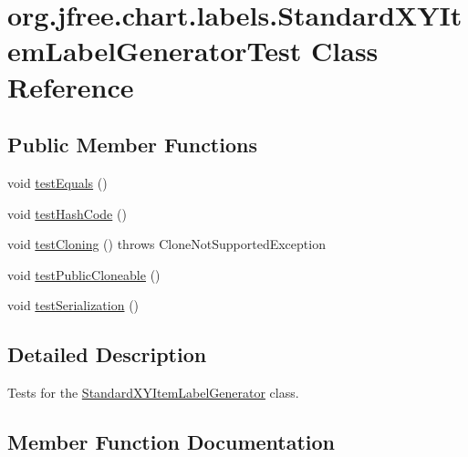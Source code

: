 \hypertarget{classorg_1_1jfree_1_1chart_1_1labels_1_1_standard_x_y_item_label_generator_test}{}\section{org.\+jfree.\+chart.\+labels.\+Standard\+X\+Y\+Item\+Label\+Generator\+Test Class Reference}
\label{classorg_1_1jfree_1_1chart_1_1labels_1_1_standard_x_y_item_label_generator_test}
\subsection*{Public Member Functions}
\begin{DoxyCompactItemize}
\item 
void \mbox{\hyperlink{classorg_1_1jfree_1_1chart_1_1labels_1_1_standard_x_y_item_label_generator_test_af247c811a6679d9d69b73f550846c8a9}{test\+Equals}} ()
\item 
void \mbox{\hyperlink{classorg_1_1jfree_1_1chart_1_1labels_1_1_standard_x_y_item_label_generator_test_a7a5edfa93e181ae60b0ce25b698feddb}{test\+Hash\+Code}} ()
\item 
void \mbox{\hyperlink{classorg_1_1jfree_1_1chart_1_1labels_1_1_standard_x_y_item_label_generator_test_a4d5eac20f8e2e50fd9fac7191c898ba0}{test\+Cloning}} ()  throws Clone\+Not\+Supported\+Exception 
\item 
void \mbox{\hyperlink{classorg_1_1jfree_1_1chart_1_1labels_1_1_standard_x_y_item_label_generator_test_a610586024d6c32e0227521d8466309d4}{test\+Public\+Cloneable}} ()
\item 
void \mbox{\hyperlink{classorg_1_1jfree_1_1chart_1_1labels_1_1_standard_x_y_item_label_generator_test_a1d53024e7dc02981c23353dfaf75f2db}{test\+Serialization}} ()
\end{DoxyCompactItemize}


\subsection{Detailed Description}
Tests for the \mbox{\hyperlink{classorg_1_1jfree_1_1chart_1_1labels_1_1_standard_x_y_item_label_generator}{Standard\+X\+Y\+Item\+Label\+Generator}} class. 

\subsection{Member Function Documentation}
\mbox{\label{classorg_1_1jfree_1_1chart_1_1labels_1_1_standard_x_y_item_label_generator_test_a4d5eac20f8e2e50fd9fac7191c898ba0}} 
